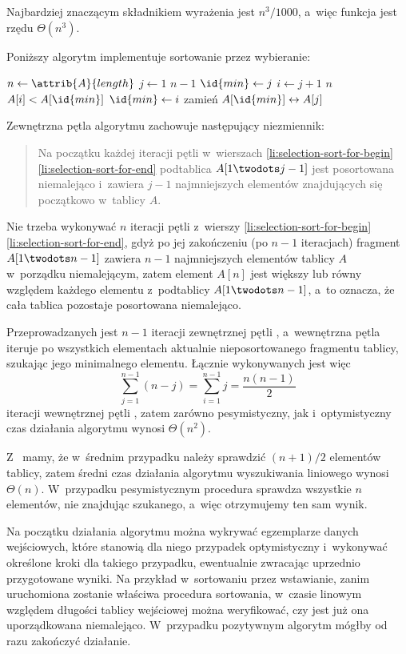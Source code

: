 
\exercise %
Najbardziej znaczącym składnikiem wyrażenia jest $n^3\!/1000$, a~więc funkcja jest rzędu $\Theta(n^3)$.

\exercise %
Poniższy algorytm implementuje sortowanie przez wybieranie:
\begin{codebox}
\li	$n\gets\attrib{A}{length}$
\li	\For $j\gets1$ \To $n-1$ \label{li:selection-sort-for-begin}
\li		\Do $\id{min}\gets j$
\li			\For $i\gets j+1$ \To $n$
\li				\Do \If $A[i]<A[\id{min}]$
\li						\Then $\id{min}\gets i$
						\End
				\End
\li			zamień $A[\id{min}]\leftrightarrow A[j]$
		\End \label{li:selection-sort-for-end}
\end{codebox}
Zewnętrzna pętla algorytmu zachowuje następujący niezmiennik:
\begin{quote}
Na początku każdej iteracji pętli  w~wierszach \ref{li:selection-sort-for-begin}\nbendash\ref{li:selection-sort-for-end} podtablica $A[1\twodots j-1]$ jest posortowana niemalejąco i~zawiera $j-1$ najmniejszych elementów znajdujących się początkowo w~tablicy $A$.
\end{quote}

Nie trzeba wykonywać $n$ iteracji pętli  z~wierszy \ref{li:selection-sort-for-begin}\nbendash\ref{li:selection-sort-for-end}, gdyż po jej zakończeniu (po $n-1$ iteracjach) fragment $A[1\twodots n-1]$ zawiera $n-1$ najmniejszych elementów tablicy $A$ w~porządku niemalejącym, zatem element $A[n]$ jest większy lub równy względem każdego elementu z~podtablicy $A[1\twodots n-1]$, a~to oznacza, że cała tablica pozostaje posortowana niemalejąco.

Przeprowadzanych jest $n-1$ iteracji zewnętrznej pętli , a~wewnętrzna pętla  iteruje po wszystkich elementach aktualnie nieposortowanego fragmentu tablicy, szukając jego minimalnego elementu.
Łącznie wykonywanych jest więc
\[
	\sum_{j=1}^{n-1}(n-j) = \sum_{i=1}^{n-1}j = \frac{n(n-1)}{2}
\]
iteracji wewnętrznej pętli , zatem zarówno pesymistyczny, jak i~optymistyczny czas działania algorytmu wynosi $\Theta(n^2)$.

\exercise %
Z~ mamy, że w~średnim przypadku należy sprawdzić $(n+1)/2$ elementów tablicy, zatem średni czas działania algorytmu wyszukiwania liniowego wynosi $\Theta(n)$.
W~przypadku pesymistycznym procedura sprawdza wszystkie $n$ elementów, nie znajdując szukanego, a~więc otrzymujemy ten sam wynik.

\exercise %
Na początku działania algorytmu można wykrywać egzemplarze danych wejściowych, które stanowią dla niego przypadek optymistyczny i~wykonywać określone kroki dla takiego przypadku, ewentualnie zwracając uprzednio przygotowane wyniki.
Na przykład w~sortowaniu przez wstawianie, zanim uruchomiona zostanie właściwa procedura sortowania, w~czasie linowym względem długości tablicy wejściowej można weryfikować, czy jest już ona uporządkowana niemalejąco.
W~przypadku pozytywnym algorytm mógłby od razu zakończyć działanie.
